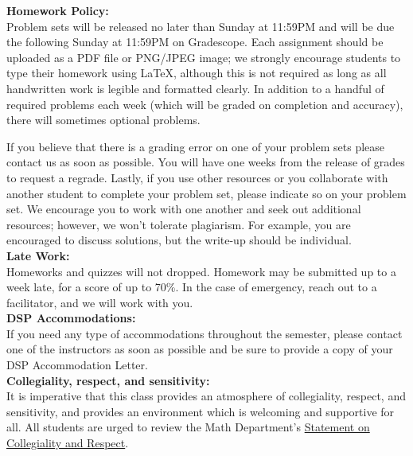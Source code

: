 \documentclass[11pt, a4paper]{article}
\begin{document}
\noindent\textbf{Homework Policy:} \\
Problem sets will be released no later than Sunday at 11:59PM and will be due the following Sunday at 11:59PM on Gradescope. Each assignment should be uploaded as a PDF file or PNG/JPEG image; we strongly encourage students to type their homework using \LaTeX{}, although this is not required as long as all handwritten work is legible and formatted clearly. In addition to a handful of required problems each week (which will be graded on completion and accuracy), there will sometimes optional problems.

If you believe that there is a grading error on one of your problem sets please contact us as soon as possible. You will have one weeks from the release of grades to request a regrade. Lastly, if you use other resources or you collaborate with another student to complete your problem set, please indicate so on your problem set. We encourage you to work with one another and seek out additional resources; however, we won’t tolerate plagiarism. For example, you are encouraged to discuss solutions, but the write-up should be individual. \\

\noindent\textbf{Late Work:} \\
Homeworks and quizzes will not dropped. Homework may be submitted up to a week late, for a score of up to 70\%. In the case of emergency, reach out to a facilitator, and we will work with you. \\

\noindent\textbf{DSP Accommodations:} \\
If you need any type of accommodations throughout the semester, please contact one of the instructors as soon as possible and be sure to provide a copy of your DSP Accommodation Letter. \\

\noindent\textbf{Collegiality, respect, and sensitivity:} \\
It is imperative that this class provides an atmosphere of collegiality, respect, and sensitivity, and provides an environment which is welcoming and supportive for all. All students are urged to review the Math Department's \href{https://math.berkeley.edu/about}{Statement on Collegiality and Respect}.
\end{document}
